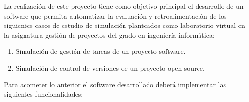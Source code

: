 
La realización de este proyecto tiene como objetivo principal el desarrollo de un software que permita automatizar la evaluación y retroalimentación de los siguientes casos de estudio de simulación planteados como laboratorio virtual en la asignatura gestión de proyectos del grado en ingeniería informática:

\begin{enumerate}
	\item Simulación de gestión de tareas de un proyecto software. 
	\item Simulación de control de versiones de un proyecto open source.
\end{enumerate}

Para acometer lo anterior el software desarrollado deberá implementar las siguientes funcionalidades:

